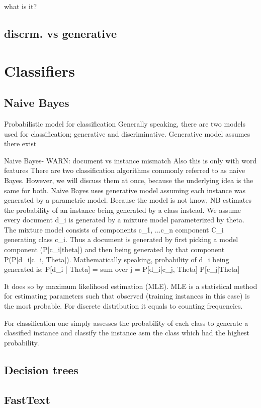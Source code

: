 what is it?

\subsection{discrm. vs generative}

\section{Classifiers}
\label{chap:clscon}

\subsection{Naive Bayes}
Probabilistic model for classification
Generally speaking, there are two models used for classification; generative and discriminative. Generative model assumes there exist 

Naive Bayes- WARN: document vs instance mismatch
Also this is only with word features
There are two classification algorithms commonly referred to as naive Bayes. However, we will discuss them at once, because the underlying idea is the same for both.
Naive Bayes uses generative model assuming each instance was generated by a parametric model. Because the model is not know, NB estimates the probability of an instance being generated by a class instead. We assume every document d\_i is generated by a mixture model parameterized by theta. The mixture model consists of components {c\_1, ...c\_n} component C\_i generating class c\_i. Thus a document is generated by first picking a model component (P[c\_i|theta]) and then being generated by that component P(P[d\_i|c\_i, Theta]).
Mathematically speaking, probability of d\_i being generated is:
P[d\_i | Theta] = sum over j = P[d\_i|c\_j, Theta] P[c\_j|Theta]


It  does so by maximum likelihood estimation (MLE).
MLE is a statistical method for estimating parameters such that observed (training instances in this case) is the most probable. For discrete distribution it equals to counting frequencies.
 
For classification one simply assesses the probability of each class to generate a classified instance and classify the instance asm the class which had the highest probability.

\subsection{Decision trees}

\subsection{FastText}


\subsection{}

\subsection{}


\section{}

